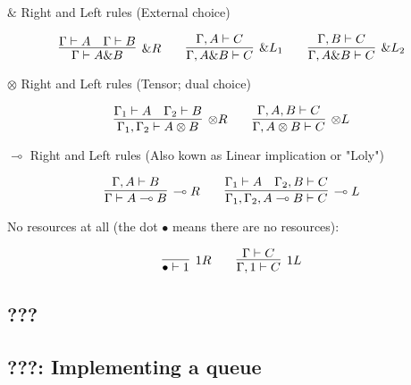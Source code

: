 \documentclass{article}
\begin{document}
	$\&$ Right and Left rules (External choice)

	\[
	\infer[\&\scriptsize{R}]
	{\Gamma \vdash A \& B}{\Gamma \vdash A \hspace{1em} \Gamma \vdash B}
	\qquad
	\infer[\&\scriptsize{L_1}]
	{\Gamma, A \& B \vdash C}{\Gamma, A \vdash C}
	\qquad
	\infer[\&\scriptsize{L_2}]
	{\Gamma, A \& B \vdash C}{\Gamma, B \vdash C}
	\]


	$\otimes$ Right and Left rules (Tensor; dual choice)

	\[
	\infer[\otimes\scriptsize{R}]
	{\Gamma_{1}, \Gamma_{2} \vdash A \otimes B}{\Gamma_{1} \vdash A \hspace{1em} \Gamma_{2} \vdash B}
	\qquad
	\infer[\otimes\scriptsize{L}]
	{\Gamma , A \otimes B \vdash C}{\Gamma, A, B \vdash C}
	\]

	$\multimap$ Right and Left rules (Also kown as Linear implication or "Loly")

	\[
	\infer[\multimap\scriptsize{R}]
	{\Gamma \vdash A \multimap B}{\Gamma, A \vdash B}
	\qquad
	\infer[\multimap\scriptsize{L}]
	{\Gamma_{1}, \Gamma_{2}, A \multimap B \vdash C}{\Gamma_{1} \vdash A \hspace{1em} \Gamma_{2}, B \vdash C}
	\]

	No resources at all (the dot $ \bullet $ means there are no resources):

	\[
	\infer[\scriptsize{1R}]
	{\bullet \vdash 1}{}
	\qquad
	\infer[\scriptsize{1L}]
	{\Gamma, 1 \vdash C}{\Gamma \vdash C}
	\]


	\subsection{???}
	\subsection{???: Implementing a queue}
	
	
	
	
	
	
	
	
	
	
	
\end{document}
